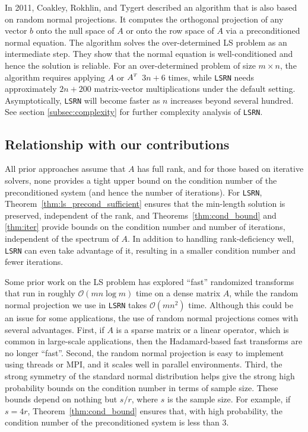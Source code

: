 \documentclass{siamltex}
\newcommand{\T}{^{\raisebox{0.09em}{\hbox{\tiny $T$}}\hspace{-0.1em}}}
\begin{document}
In 2011, Coakley, Rokhlin, and Tygert \cite{coakley2011fast} described an
algorithm that is also based on random normal projections. It computes the
orthogonal projection of any vector $b$ onto the null space of $A$ or onto the
row space of $A$ via a preconditioned normal equation.  The algorithm solves the
over-determined LS problem as an intermediate step. They show that the normal
equation is well-conditioned and hence the solution is reliable. For an
over-determined problem of size $m \times n$, the algorithm requires applying
$A$ or $A\T$\, $3 n + 6$ times, while \texttt{LSRN} needs approximately $2 n +
200$ matrix-vector multiplications under the default setting.
Asymptotically, \texttt{LSRN} will become faster as $n$ increases beyond
several hundred.
See section \ref{subsec:complexity} for further complexity analysis of
\texttt{LSRN}.

\subsection{Relationship with our contributions}

All prior approaches assume that $A$ has full rank, and for those based on
iterative solvers, none provides a tight upper bound on the condition number of
the preconditioned system (and hence the number of iterations). For
\texttt{LSRN}, Theorem~\ref{thm:ls_precond_sufficient} ensures that the
min-length solution is preserved, independent of the rank, and
Theorems~\ref{thm:cond_bound} and \ref{thm:iter} provide bounds on the condition
number and number of iterations, independent of the spectrum of $A$.  In
addition to handling rank-deficiency well, \texttt{LSRN} can even take advantage
of it, resulting in a smaller condition number and fewer iterations.

Some prior work on the LS problem has explored ``fast'' randomized transforms
that run in roughly $\mathcal{O}( m n \log m )$ time on a dense matrix $A$,
while the random normal projection we use in \texttt{LSRN} takes $\mathcal{O}( m
n^2 )$ time.  Although this could be an issue for some applications, the use of
random normal projections comes with several advantages.  First, if $A$ is a
sparse matrix or a linear operator, which is common in large-scale applications,
then the Hadamard-based fast transforms are no longer ``fast''. Second, the
random normal projection is easy to implement using threads or MPI, and it
scales well in parallel environments.  Third, the strong symmetry of the
standard normal distribution helps give the strong high probability bounds on
the condition number in terms of sample size. These bounds depend on nothing but
$s/r$, where $s$ is the sample size.  For example, if $s = 4r$,
Theorem~\ref{thm:cond_bound} ensures that, with high probability, the condition
number of the preconditioned system is less than $3$.
\end{document}

